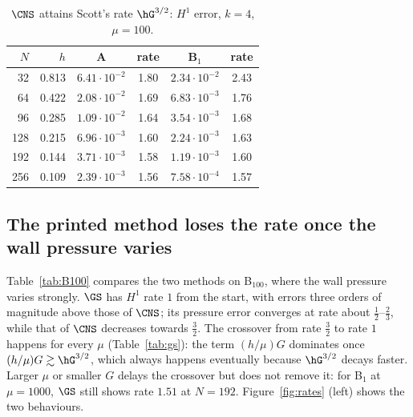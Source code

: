 \begin{table}[t]
\centering\small
\caption{$\CNS$ attains Scott's rate $\hG^{3/2}$: $H^1$ error, $k=4$, $\mu=100$.}\label{tab:cns}
\begin{tabular}{rrcccc}
\toprule
$N$ & $h$ & A & rate & B$_1$ & rate\\
\midrule
32 & 0.813 & $6.41\cdot10^{-2}$ & 1.80 & $2.34\cdot10^{-2}$ & 2.43\\
64 & 0.422 & $2.08\cdot10^{-2}$ & 1.69 & $6.83\cdot10^{-3}$ & 1.76\\
96 & 0.285 & $1.09\cdot10^{-2}$ & 1.64 & $3.54\cdot10^{-3}$ & 1.68\\
128 & 0.215 & $6.96\cdot10^{-3}$ & 1.60 & $2.24\cdot10^{-3}$ & 1.63\\
192 & 0.144 & $3.71\cdot10^{-3}$ & 1.58 & $1.19\cdot10^{-3}$ & 1.60\\
256 & 0.109 & $2.39\cdot10^{-3}$ & 1.56 & $7.58\cdot10^{-4}$ & 1.57\\
\bottomrule
\end{tabular}
\end{table}

\subsection{The printed method loses the rate once the wall pressure varies}
Table~\ref{tab:B100} compares the two methods on B$_{100}$, where the wall pressure varies strongly. $\GS$ has $H^1$ rate $1$ from the start, with errors three orders of magnitude above those of $\CNS$; its pressure error converges at rate about $\frac12$--$\frac23$, while that of $\CNS$ decreases towards $\frac32$. The crossover from rate $\frac32$ to rate $1$ happens for every $\mu$ (Table~\ref{tab:gs}): the term $(h/\mu)G$ dominates once $(h/\mu)G\gtrsim\hG^{3/2}$, which always happens eventually because $\hG^{3/2}$ decays faster. Larger $\mu$ or smaller $G$ delays the crossover but does not remove it: for B$_1$ at $\mu=1000$, $\GS$ still shows rate $1.51$ at $N=192$. Figure~\ref{fig:rates} (left) shows the two behaviours.

